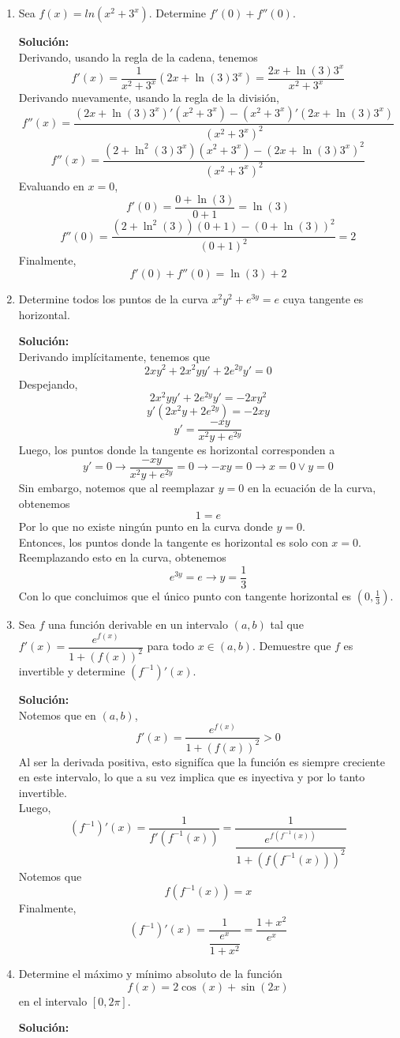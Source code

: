 \documentclass[12pt]{article}
\newenvironment{solucion}
{\begin{mdframed}[backgroundcolor=black!10]
		{\bf Solución:}\\
	}
	{
	\end{mdframed}
}
\newenvironment{preguntas}
{\begin{enumerate}\itemsep12pt
	}
	{
	\end{enumerate}
}
\newcommand{\ra}{\rightarrow}
\begin{document}
\begin{preguntas}
\item Sea $f(x) = ln(x^2+3^x)$. Determine $f'(0) + f''(0)$.
\begin{solucion}
Derivando, usando la regla de la cadena, tenemos
$$f'(x) = \dfrac{1}{x^2+3^x}(2x + \ln(3)3^x) = \dfrac{2x + \ln(3)3^x}{x^2+3^x}$$
Derivando nuevamente, usando la regla de la división,
$$f''(x) = \dfrac{(2x + \ln(3)3^x)'(x^2+3^x) - (x^2+3^x)'(2x + \ln(3)3^x)}{(x^2+3^x)^2}$$
$$f''(x) = \dfrac{(2 + \ln^2(3)3^x)(x^2+3^x) - (2x + \ln(3)3^x)^2}{(x^2+3^x)^2}$$
Evaluando en $x=0$,
$$f'(0) = \dfrac{0 + \ln(3)}{0+1} = \ln(3)$$
$$f''(0) = \dfrac{(2+\ln^2(3))(0+1) - (0+\ln(3))^2}{(0+1)^2} = 2$$
Finalmente,
$$f'(0) + f''(0) = \ln(3) + 2$$
\end{solucion}
\item Determine todos los puntos de la curva $x^2y^2 + e^{3y} = e$ cuya tangente es horizontal.
\begin{solucion}
Derivando implícitamente, tenemos que
$$2xy^2 + 2x^2yy' + 2e^{2y}y' = 0$$
Despejando,
$$2x^2yy' + 2e^{2y}y' = -2xy^2$$
$$y'(2x^2y + 2e^{2y}) = -2xy$$
$$y' = \dfrac{-xy}{x^2y + e^{2y}}$$
Luego, los puntos donde la tangente es horizontal corresponden a
$$y'= 0 \ra \dfrac{-xy}{x^2y + e^{2y}} = 0 \ra -xy = 0 \ra x = 0 \vee y = 0$$
Sin embargo, notemos que al reemplazar $y=0$ en la ecuación de la curva, obtenemos
$$1 = e$$
Por lo que no existe ningún punto en la curva donde $y=0$.\\

Entonces, los puntos donde la tangente es horizontal es solo con $x=0$. Reemplazando esto en la curva, obtenemos
$$e^{3y} = e \ra y = \dfrac{1}{3}$$
Con lo que concluimos que el único punto con tangente horizontal es $(0,\frac{1}{3})$.
\end{solucion}
\item Sea $f$ una función derivable en un intervalo $(a,b)$ tal que $f'(x) = \dfrac{e^{f(x)}}{1+(f(x))^2}$ para todo $x \in (a,b)$. Demuestre que $f$ es invertible y determine $(f^{-1})'(x)$.
\begin{solucion}
Notemos que en $(a,b)$,
$$f'(x) = \dfrac{e^{f(x)}}{1+(f(x))^2} > 0$$
Al ser la derivada positiva, esto signifíca que la función es siempre creciente en este intervalo, lo que a su vez implica que es inyectiva y por lo tanto invertible.\\

Luego,
$$(f^{-1})'(x) = 
\dfrac{1}{f'(f^{-1}(x))} = 
\dfrac{1}{\dfrac{e^{f(f^{-1}(x))}}{1+(f(f^{-1}(x)))^2}}$$
Notemos que 
$$f(f^{-1}(x)) = x$$
Finalmente,
$$(f^{-1})'(x) = \dfrac{1}{\dfrac{e^x}{1+x^2}} = \dfrac{1+x^2}{e^x}$$
\end{solucion}
\item Determine el máximo y mínimo absoluto de la función 
$$f(x) = 2\cos (x) + \sin (2x)$$
en el intervalo $[0, 2\pi]$.
\begin{solucion}


\end{solucion}
\end{preguntas}
\end{document}
